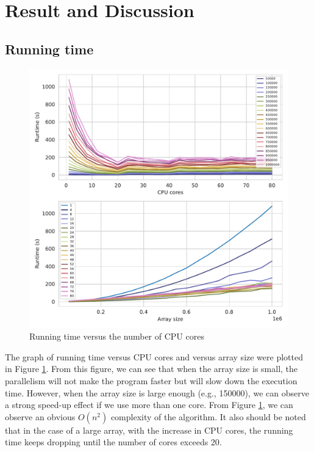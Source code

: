\documentclass[twoside,12pt]{article}
\theoremstyle{definition}
\theoremstyle{remark}
\begin{document}
\newpage
\section{Result and Discussion}
\subsection{Running time}
\begin{figure}[t!]
    \centering
    \includegraphics[width=\textwidth]{../analysis/runtime.pdf}
    \caption{Running time versus the number of CPU cores}
    \label{fig:runtime}
\end{figure}

The graph of running time versus CPU cores and versus array size were plotted
in Figure \ref{fig:runtime}.
From this figure, we can see that when the array size is small,
the parallelism will not make the program faster but will slow down the execution time.
However, when the array size is large enough (e.g., 150000), we can observe a strong
speed-up effect if we use more than one core.
From Figure \ref{fig:runtime}, we can observe an obvious $O(n^2)$ complexity
of the algorithm.
It also should be noted that in the case of a large array,
with the increase in CPU cores,
the running time keeps dropping until the number of cores exceeds 20.
\end{document}
